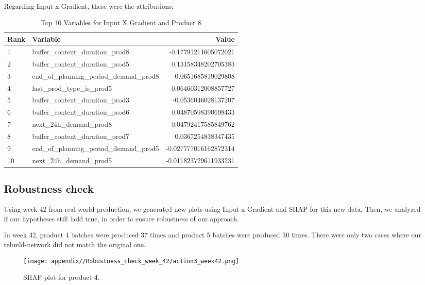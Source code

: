 Regarding Input x Gradient, these were the attributions:

\begin{table}[ht!]
    \footnotesize
    \centering
    \caption{Top 10 Variables for Input X Gradient and Product 8}
    \label{tab:top_variables_target7}
    \begin{tabularx}{\textwidth}{lXr}
        \toprule
        \textbf{Rank} & \textbf{Variable}                        & \textbf{Value}        \\
        \midrule
        1             & buffer\_content\_duration\_prod8         & -0.17791211605072021  \\
        2             & buffer\_content\_duration\_prod5         & 0.13158348202705383   \\
        3             & end\_of\_planning\_period\_demand\_prod8 & 0.0651685819029808    \\
        4             & last\_prod\_type\_is\_prod5              & -0.06460312008857727  \\
        5             & buffer\_content\_duration\_prod3         & -0.0536046028137207   \\
        6             & buffer\_content\_duration\_prod6         & 0.04870598390698433   \\
        7             & next\_24h\_demand\_prod8                 & 0.04792417585849762   \\
        8             & buffer\_content\_duration\_prod7         & 0.0367254838347435    \\
        9             & end\_of\_planning\_period\_demand\_prod5 & -0.027777016162872314 \\
        10            & next\_24h\_demand\_prod5                 & -0.011823729611933231 \\
        \bottomrule
    \end{tabularx}
\end{table}
\FloatBarrier


\subsection{Robustness check}
Using week 42 from real-world production, we generated new plots using Input x Gradient and SHAP for this new data. Then, we analyzed if our hypotheses still hold true, in order to ensure robustness of our approach.

In week 42, product 4 batches were produced 37 times and product 5 batches were produced 30 times. There were only two cases where our rebuild-network did not match the original one.
\begin{figure}
    \centering
    \texttt{[image: appendix//Robustness\_check\_week\_42/action3\_week42.png]}
    \caption{SHAP plot for product 4.}
    \label{fig:agg4-week42}
\end{figure}


